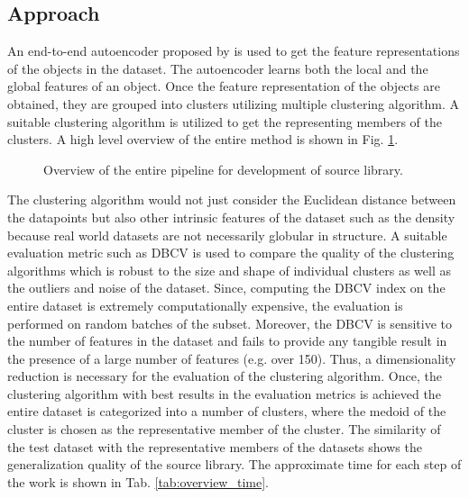 \subsection{Approach}
An end-to-end autoencoder proposed by \cite{mei2022unsupervised} is used to get the feature representations of the objects in the dataset\cite{Koch_2019_CVPR}. The autoencoder learns both the local and the global features of an object. Once the feature representation of the objects are obtained, they are grouped into clusters utilizing multiple clustering algorithm. A suitable clustering algorithm is utilized to get the representing members of the clusters. A high level overview of the entire method is shown in Fig. \ref{fig:overview}.
\begin{figure}[t]
  \centering
  \caption{Overview of the entire pipeline for development of source library.}
  \label{fig:overview}
\end{figure}
 The clustering algorithm would not just consider the Euclidean distance between the datapoints but also other intrinsic features of the dataset such as the density because real world datasets are not necessarily globular in structure. A suitable evaluation metric such as \ac{DBCV}\cite{moulavi2014density} is used to compare the quality of the clustering algorithms which is robust to the size and shape of individual clusters as well as the outliers and noise of the dataset. Since, computing the \ac{DBCV} index on the entire dataset is extremely computationally expensive, the evaluation is performed on random batches of the subset. Moreover, the \ac{DBCV} is sensitive to the number of features in the dataset and fails to provide any tangible result in the presence of a large number of features (e.g. over 150). Thus, a dimensionality reduction is necessary for the evaluation of the clustering algorithm. Once, the clustering algorithm with best results in the evaluation metrics is achieved the entire dataset is categorized into a number of clusters, where the medoid of the cluster is chosen as the representative member of the cluster. The similarity of the test dataset with the representative members of the datasets shows the generalization quality of the source library. The approximate time for each step of the work is shown in Tab. \ref{tab:overview_time}.

